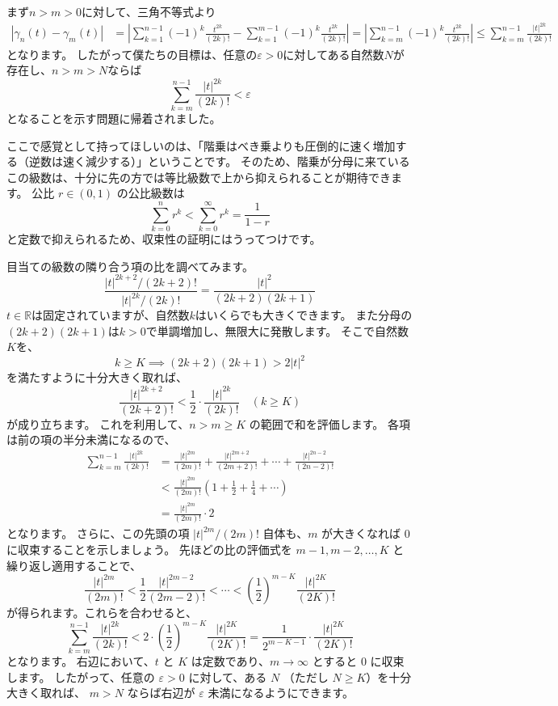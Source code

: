 まず$n>m>0$に対して、三角不等式より
\begin{align*}
  |\gamma_n(t)-\gamma_m(t)|&=\left|\sum_{k=1}^{n-1}(-1)^k\frac{t^{2k}}{(2k)!}-\sum_{k=1}^{m-1}(-1)^k\frac{t^{2k}}{(2k)!}\right|=\left|\sum_{k=m}^{n-1}(-1)^k\frac{t^{2k}}{(2k)!}\right|\leq\sum_{k=m}^{n-1}\frac{|t|^{2k}}{(2k)!}
\end{align*}
となります。
したがって僕たちの目標は、任意の$\varepsilon>0$に対してある自然数$N$が存在し、$n>m>N$ならば
\[
  \sum_{k=m}^{n-1}\frac{|t|^{2k}}{(2k)!}<\varepsilon
\]
となることを示す問題に帰着されました。

ここで感覚として持ってほしいのは、「階乗はべき乗よりも圧倒的に速く増加する（逆数は速く減少する）」ということです。
そのため、階乗が分母に来ているこの級数は、十分に先の方では等比級数で上から抑えられることが期待できます。
公比 $r \in (0,1)$ の公比級数は
\[
  \sum_{k=0}^n r^k < \sum_{k=0}^\infty r^k = \frac{1}{1-r}
\]
と定数で抑えられるため、収束性の証明にはうってつけです。

目当ての級数の隣り合う項の比を調べてみます。
\[
  \frac{|t|^{2k+2}/(2k+2)!}{|t|^{2k}/(2k)!}=\frac{|t|^2}{(2k+2)(2k+1)}
\]
$t\in\mathbb{R}$は固定されていますが、自然数$k$はいくらでも大きくできます。
また分母の$(2k+2)(2k+1)$は$k>0$で単調増加し、無限大に発散します。
そこで自然数$K$を、
\[
  k \geq K \implies (2k+2)(2k+1) > 2|t|^2
\]
を満たすように十分大きく取れば、
\[
  \frac{|t|^{2k+2}}{(2k+2)!} < \frac12\cdot \frac{|t|^{2k}}{(2k)!} \quad (k \geq K)
\]
が成り立ちます。
これを利用して、$n > m \geq K$ の範囲で和を評価します。
各項は前の項の半分未満になるので、
\begin{align*}
  \sum_{k=m}^{n-1}\frac{|t|^{2k}}{(2k)!} 
  &= \frac{|t|^{2m}}{(2m)!} + \frac{|t|^{2m+2}}{(2m+2)!} + \cdots + \frac{|t|^{2n-2}}{(2n-2)!} \\
  &< \frac{|t|^{2m}}{(2m)!} \left( 1 + \frac{1}{2} + \frac{1}{4} + \cdots \right) \\
  &= \frac{|t|^{2m}}{(2m)!} \cdot 2
\end{align*}
となります。
さらに、この先頭の項 $|t|^{2m}/(2m)!$ 自体も、$m$ が大きくなれば $0$ に収束することを示しましょう。
先ほどの比の評価式を $m-1, m-2, \dots, K$ と繰り返し適用することで、
\[
  \frac{|t|^{2m}}{(2m)!} < \frac{1}{2}\frac{|t|^{2m-2}}{(2m-2)!} < \cdots < \left(\frac{1}{2}\right)^{m-K}\frac{|t|^{2K}}{(2K)!}
\]
が得られます。これらを合わせると、
\[
  \sum_{k=m}^{n-1}\frac{|t|^{2k}}{(2k)!} < 2 \cdot \left(\frac{1}{2}\right)^{m-K}\frac{|t|^{2K}}{(2K)!} = \frac{1}{2^{m-K-1}} \cdot \frac{|t|^{2K}}{(2K)!}
\]
となります。
右辺において、$t$ と $K$ は定数であり、$m \to \infty$ とすると $0$ に収束します。
したがって、任意の $\varepsilon > 0$ に対して、ある $N$ （ただし $N \geq K$）を十分大きく取れば、
$m > N$ ならば右辺が $\varepsilon$ 未満になるようにできます。

